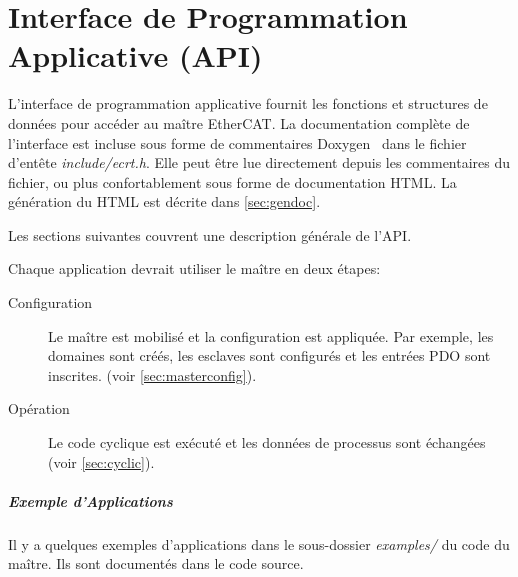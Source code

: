 \documentclass[a4paper,12pt,BCOR6mm,bibtotoc,idxtotoc]{scrbook}
\begin{document}

\chapter{Interface de Programmation Applicative (API)}
\label{chap:api}

%

L'interface de programmation applicative fournit les fonctions et
structures de donn\'ees pour acc\'eder au ma\^itre EtherCAT.  La
documentation compl\`ete de l'interface est incluse sous forme de
commentaires Doxygen~\cite{doxygen} dans le fichier d'ent\^ete
\textit{include/ecrt.h}. Elle peut \^etre lue directement depuis les
commentaires du fichier, ou plus confortablement sous forme de
documentation HTML. La g\'en\'eration du HTML est d\'ecrite dans
\autoref{sec:gendoc}.

Les sections suivantes couvrent une description g\'en\'erale de l'API.

Chaque application devrait utiliser le ma\^itre en deux \'etapes:

\begin{description}

\item[Configuration] Le ma\^itre est mobilis\'e et la configuration
  est appliqu\'ee. Par exemple, les domaines sont cr\'e\'es, les
  esclaves sont configur\'es et les entr\'ees PDO sont inscrites.
  (voir \autoref{sec:masterconfig}).

\item[Op\'eration] Le code cyclique est ex\'ecut\'e et les donn\'ees de
  processus sont \'echang\'ees (voir \autoref{sec:cyclic}).

\end{description}

\paragraph{Exemple d'Applications}
Il y a quelques exemples d'applications dans le sous-dossier
\textit{examples/} du code du ma\^itre. Ils sont document\'es dans le
code source.

\end{document}
